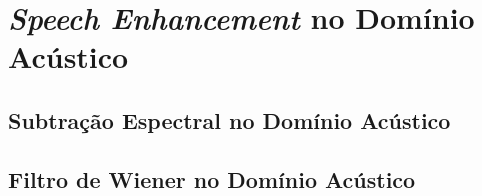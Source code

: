 \section{\textit{Speech Enhancement} no Domínio Acústico}
\subsection{Subtração Espectral no Domínio Acústico}
\subsection{Filtro de Wiener no Domínio Acústico}